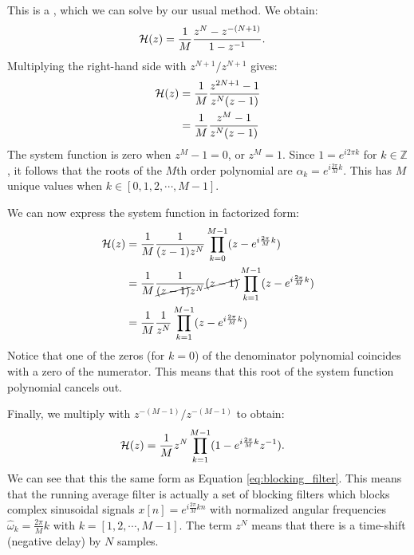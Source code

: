 \noindent This is a \emph{}, which we can solve by our usual method. We obtain:
\begin{align}
\mathcal{H}(z) &= \frac{1}{M}\frac{z^{N} - z^{-(N+1)}}{1-z^{-1}}.
\end{align}
Multiplying the right-hand side with $z^{N+1}/z^{N+1}$ gives:
\begin{align}
  \mathcal{H}(z) &= \frac{1}{M}\frac{z^{2N+1} - 1}{z^{N}(z-1)}\\
       &= \frac{1}{M}\frac{z^{M} - 1}{z^{N}(z-1)}
\end{align}
The system function is zero when $z^{M} -1=0$, or $z^M = 1$. Since $1 =
e^{i2\pi k}$ for $k\in\mathbb{Z}$, it follows that the roots of the
$M$th order polynomial are $\alpha_k=e^{i\frac{2\pi}{M}k}$. This has
$M$ unique values when $k\in [0,1,2,\cdots, M-1]$.

We can now express the system function in factorized form:
\begin{align}
\mathcal{H}(z) &= \frac{1}{M} \frac{1}{(z-1)z^{N}}\prod_{k=0}^{M-1}(z-e^{i\frac{2\pi}{M}k}) \\
 &= \frac{1}{M} \frac{1}{\cancel{(z-1)}z^{N}}\cancel{(z-1)}\prod_{k=1}^{M-1}(z-e^{i\frac{2\pi}{M}k}) \\
 &= \frac{1}{M} \frac{1}{z^{N}} \prod_{k=1}^{M-1}(z-e^{i\frac{2\pi}{M}k}) 
\end{align}
Notice that one of the zeros (for $k=0$) of the denominator polynomial coincides
with a zero of the numerator. This means that this root
of the system function polynomial cancels out.

Finally, we multiply with $z^{-(M-1)}/z^{-(M-1)}$ to obtain:
\begin{align}
\mathcal{H}(z) &= \frac{1}{M} z^{N} \prod_{k=1}^{M-1}(1-e^{i\frac{2\pi}{M}k}z^{-1}).
\end{align}
We can see that this the same form as Equation
\ref{eq:blocking_filter}. This means that the running average filter
is actually a set of blocking filters which blocks complex sinusoidal
signals $x[n]=e^{i\frac{2\pi}{M}kn}$ with normalized angular frequencies
$\hat{\omega}_k=\frac{2\pi}{M}k$ with $k=[1,2,\cdots,M-1]$. The term
$z^{N}$ means that there is a time-shift (negative delay) by $N$ samples.

